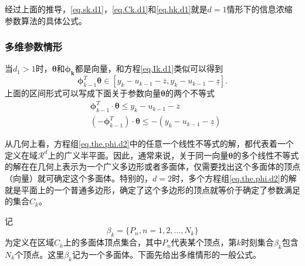 经过上面的推导，\eqref{eq.sk.d1}，\eqref{eq.Ck.d1}和\eqref{eq.hk.d1}就是$d=1$情形下的信息浓缩参数算法的具体公式。
\subsubsection{多维参数情形}
\label{subsec2.3.3.2}
当$d_{1}>1$时，$\bm{\theta}$和$\bm{\phi_{k}}$都是向量，和方程\eqref{eq.Ik.d1}类似可以得到
\begin{equation}%
\label{eq.the.phi.d2}
\bm{\phi}_{k-1}^{T}\bm{\theta}\in[y_{k}-u_{k-1}-\overline{z},y_{k}-u_{k-1}-\underline{z}].
\end{equation}
上面的区间形式可以写成下面关于参数向量$\bm{\theta}$的两个不等式
\begin{equation}%
\label{eq.the.phi.d2}
\begin{split}%
&\bm{\phi}_{k-1}^{T}\cdot\bm{\theta}\leq y_{k}-u_{k-1}-\overline{z}\\
&(-\bm{\phi}_{k-1}^{T})\cdot\bm{\theta}\leq -(y_{k}-u_{k-1}-\underline{z})
\end{split}
\end{equation}

从几何上看，方程组\eqref{eq.the.phi.d2}中的任意一个线性不等式的解，都代表着一个定义在域$\mathcal{R}^{d}$上的广义半平面。因此，通常来说，关于同一向量$\bm{\theta}$的多个线性不等式的解在在几何上表示为一个广义多边形或者多面体，仅需要找出这个多面体的顶点（向量）就可确定这个多面体。特别的，$d=2$时，多个方程组\eqref{eq.the.phi.d2}的解就是平面上的一个普通多边形，确定了这个多边形的顶点就等价于确定了参数满足的集合$C_{k}$。

记
\begin{equation}%
\label{eq.Vk}
\beta_{k}=\{P_{n},n=1,2,\ldots,N_{k}\}
\end{equation}
为定义在区域$C_{k}$上的多面体顶点集合，其中$P_{n}$代表某个顶点，第$k$时刻集合$\beta_{k}$包含$N_{k}$个顶点。这里$\beta_{k}$记为一个多面体。下面先给出多维情形的一般公式。

